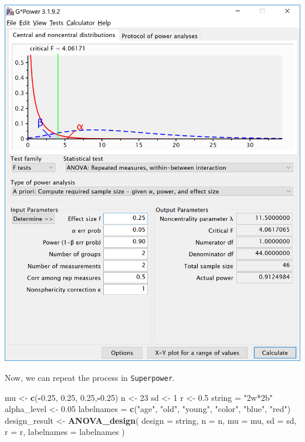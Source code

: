 \documentclass[
]{book}
\newenvironment{Shaded}{\begin{snugshade}}{\end{snugshade}}
\newcommand{\DataTypeTok}[1]{\textcolor[rgb]{0.13,0.29,0.53}{#1}}
\newcommand{\DecValTok}[1]{\textcolor[rgb]{0.00,0.00,0.81}{#1}}
\newcommand{\FloatTok}[1]{\textcolor[rgb]{0.00,0.00,0.81}{#1}}
\newcommand{\KeywordTok}[1]{\textcolor[rgb]{0.13,0.29,0.53}{\textbf{#1}}}
\newcommand{\NormalTok}[1]{#1}
\newcommand{\OperatorTok}[1]{\textcolor[rgb]{0.81,0.36,0.00}{\textbf{#1}}}
\newcommand{\StringTok}[1]{\textcolor[rgb]{0.31,0.60,0.02}{#1}}
\begin{document}
\includegraphics{screenshots/gpower_5.png}
\newpage

Now, we can repeat the process in \texttt{Superpower}.

\begin{Shaded}
\begin{Highlighting}[]
\NormalTok{mu <-}\StringTok{ }\KeywordTok{c}\NormalTok{(}\OperatorTok{-}\FloatTok{0.25}\NormalTok{, }\FloatTok{0.25}\NormalTok{, }\FloatTok{0.25}\NormalTok{,}\OperatorTok{-}\FloatTok{0.25}\NormalTok{)}
\NormalTok{n <-}\StringTok{ }\DecValTok{23}
\NormalTok{sd <-}\StringTok{ }\DecValTok{1}
\NormalTok{r <-}\StringTok{ }\FloatTok{0.5}
\NormalTok{string =}\StringTok{ "2w*2b"}
\NormalTok{alpha_level <-}\StringTok{ }\FloatTok{0.05}
\NormalTok{labelnames =}\StringTok{ }\KeywordTok{c}\NormalTok{(}\StringTok{"age"}\NormalTok{, }\StringTok{"old"}\NormalTok{, }\StringTok{"young"}\NormalTok{, }\StringTok{"color"}\NormalTok{, }\StringTok{"blue"}\NormalTok{, }\StringTok{"red"}\NormalTok{)}
\NormalTok{design_result <-}\StringTok{ }\KeywordTok{ANOVA_design}\NormalTok{(}
\DataTypeTok{design =}\NormalTok{ string,}
\DataTypeTok{n =}\NormalTok{ n,}
\DataTypeTok{mu =}\NormalTok{ mu,}
\DataTypeTok{sd =}\NormalTok{ sd,}
\DataTypeTok{r =}\NormalTok{ r,}
\DataTypeTok{labelnames =}\NormalTok{ labelnames}
\NormalTok{)}
\end{Highlighting}
\end{Shaded}
\end{document}
